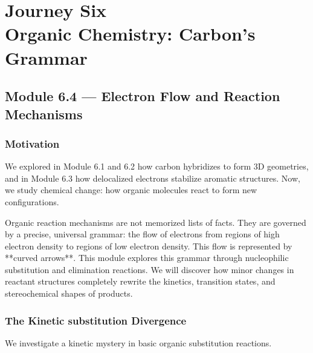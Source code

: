 \documentclass[12pt, a4paper]{book}
\begin{document}
\setcounter{chapter}{5}
\chapter[Journey 6 --- Organic Chemistry: Carbon's Grammar]
        {Journey Six\\[8pt]
         \textcolor{ModuleColor}{\large Organic Chemistry: Carbon's Grammar}}
\setcounter{section}{3}

\section{Module 6.4 --- Electron Flow and Reaction Mechanisms}
\label{sec:mod6.4}

\subsection*{Motivation}

We explored in Module 6.1 and 6.2 how carbon hybridizes to form 3D geometries, and in Module 6.3 how delocalized electrons stabilize aromatic structures.
Now, we study chemical change: how organic molecules react to form new configurations.

Organic reaction mechanisms are not memorized lists of facts.
They are governed by a precise, universal grammar: the flow of electrons from regions of high electron density to regions of low electron density.
This flow is represented by **curved arrows**.
This module explores this grammar through nucleophilic substitution and elimination reactions.
We will discover how minor changes in reactant structures completely rewrite the kinetics, transition states, and stereochemical shapes of products.

\subsection{The Kinetic substitution Divergence}

We investigate a kinetic mystery in basic organic substitution reactions.
\end{document}
